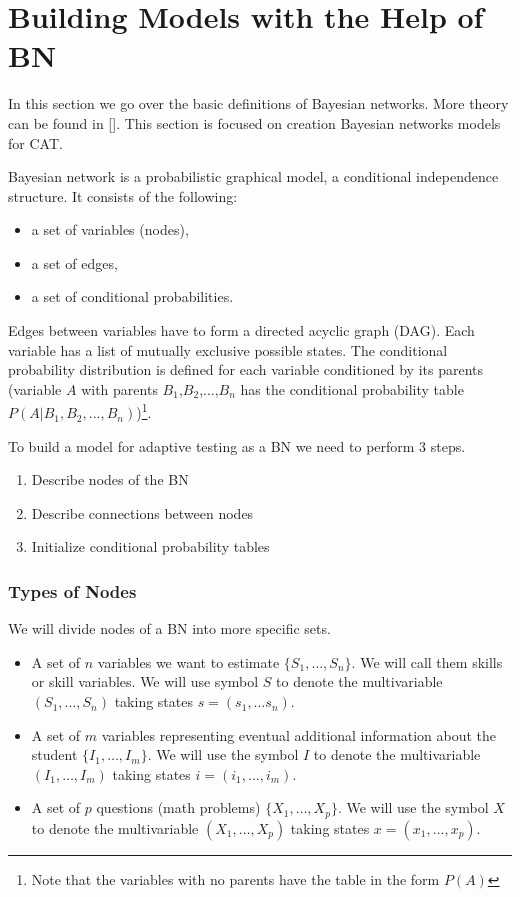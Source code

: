 \section{Building Models with the Help of BN}

In this section we go over the basic definitions of Bayesian networks. More theory can be found in []. This section is focused on creation Bayesian networks models for CAT.

Bayesian network is a probabilistic graphical model, a conditional independence structure. It consists of the following: 
\begin{itemize}
	\item a set of variables (nodes),
	\item a set of edges,
	\item a set of conditional probabilities.
\end{itemize}
Edges between variables have to form a directed acyclic graph (DAG). Each variable has a list of mutually exclusive possible states. The conditional probability distribution is defined for each variable conditioned by its parents (variable $A$ with parents $B_1$,$B_2$,...,$B_n$ has the conditional probability table ${P(A|B_1,B_2,...,B_n)}$)\footnote{Note that the variables with no parents have the table in the form $P(A)$}. 

To build a model for adaptive testing as a BN we need to perform 3 steps.
\begin{enumerate}
	\item Describe nodes of the BN
	\item Describe connections between nodes
	\item Initialize conditional probability tables
\end{enumerate}
 
\subsubsection{Types of Nodes}
We will divide nodes of a BN into more specific sets. 
\begin{itemize} 
\item A set of $n$ variables we want to estimate $\{S_1,\ldots,S_n\}$. 
We will call them skills or skill variables. We will use symbol $S$ to denote the multivariable $(S_1,\ldots,S_n)$ taking states $s = (s_1,\ldots s_n)$. 
\item A set of $m$ variables representing eventual additional information about the student $\{I_1,\ldots,I_m\}$.  
We will use the symbol $I$ to denote the multivariable $(I_1,\ldots,I_m)$ taking states $i = (i_1,\ldots,i_m)$.
\item A set of $p$ questions (math problems) $\{X_1,\ldots,X_p\}$.  
We will use the symbol $X$ to denote the multivariable $(X_1,\ldots,X_p)$ taking states $x = (x_1,\ldots,x_p)$.
\end{itemize}

